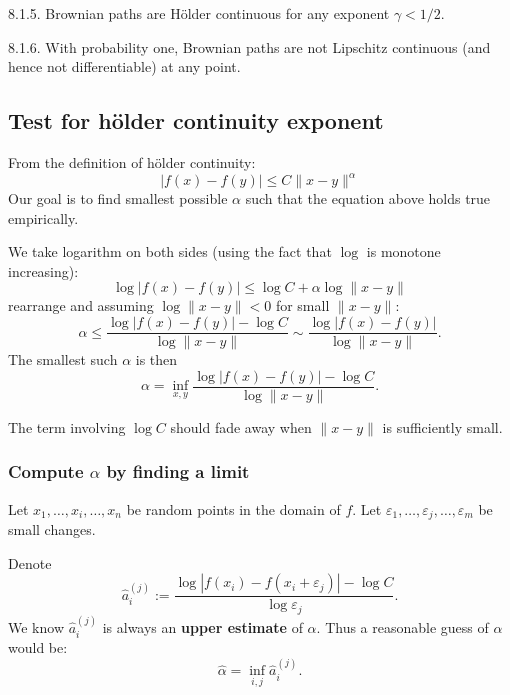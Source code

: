 \begin{theorem}
8.1.5. Brownian paths are Hölder continuous for any exponent $\gamma<1 / 2$.
\end{theorem}

\begin{theorem}
	8.1.6. With probability one, Brownian paths are not Lipschitz continuous (and hence not differentiable) at any point.
\end{theorem}

\subsection{Test for hölder continuity exponent}

From the definition of hölder continuity: 
\[
	|f(x)-f(y)| \leq C\|x-y\|^\alpha
\] 
Our goal is to find smallest possible $\alpha$ such that the equation above holds true empirically.

We take logarithm on both sides (using the fact that $\log$ is monotone increasing):
\[
	\log |f(x) - f(y)| \le \log C + \alpha \log \|x-y\|
\] 
rearrange and assuming $\log\|x-y\|<0$ for small $\|x-y\|$:
\begin{equation}
	\alpha \le \frac{\log \left| f(x) - f(y) \right| - \log C}{\log \|x - y\|} \sim \frac{\log \left| f(x) - f(y) \right| }{\log \|x-y\|}
.\end{equation} 
The smallest such $\alpha$ is then
\begin{equation}
	\label{eqn:holder-fit-1}
	\alpha 
	= \operatorname{inf}_{x, y} \frac{\log \left| f(x) - f(y) \right| - \log C}{\log \|x - y\|}
.\end{equation}


The term involving $\log C$ should fade away when $\|x-y\|$ is sufficiently small. 

\subsubsection{Compute $\alpha$ by finding a limit}
Let $x_1, \ldots, x_i, \ldots, x_n$ be random points in the domain of $f$. Let $\varepsilon_1, \ldots, \varepsilon_j, \ldots, \varepsilon_m$ be small changes.

Denote 
		\[
			\hat{a} _i^{(j)} := \frac{\log \left| f(x_i) - f(x_i + \varepsilon_j) \right| - \log C}{\log \varepsilon_j}
		.\] 
	We know $\hat{a}_i^{(j)}$ is always an \textbf{upper estimate} of $\alpha$. Thus a reasonable guess of $\alpha$ would be:
	\[
		\hat{\alpha} = \operatorname{inf}_{i, j} \hat{a}_i^{(j)}
	.\] 

